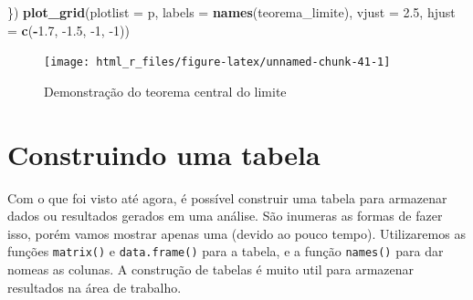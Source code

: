 \documentclass[
]{book}
\newenvironment{Shaded}{\begin{snugshade}}{\end{snugshade}}
\newcommand{\DataTypeTok}[1]{\textcolor[rgb]{0.13,0.29,0.53}{#1}}
\newcommand{\DecValTok}[1]{\textcolor[rgb]{0.00,0.00,0.81}{#1}}
\newcommand{\FloatTok}[1]{\textcolor[rgb]{0.00,0.00,0.81}{#1}}
\newcommand{\KeywordTok}[1]{\textcolor[rgb]{0.13,0.29,0.53}{\textbf{#1}}}
\newcommand{\NormalTok}[1]{#1}
\newcommand{\OperatorTok}[1]{\textcolor[rgb]{0.81,0.36,0.00}{\textbf{#1}}}
\begin{document}
\begin{Shaded}
\begin{Highlighting}[]
\NormalTok{\})}
\KeywordTok{plot_grid}\NormalTok{(}\DataTypeTok{plotlist =}\NormalTok{ p,}
          \DataTypeTok{labels =} \KeywordTok{names}\NormalTok{(teorema_limite),}
          \DataTypeTok{vjust =} \FloatTok{2.5}\NormalTok{,}
          \DataTypeTok{hjust =} \KeywordTok{c}\NormalTok{(}\OperatorTok{-}\FloatTok{1.7}\NormalTok{, }\FloatTok{-1.5}\NormalTok{, }\DecValTok{-1}\NormalTok{, }\DecValTok{-1}\NormalTok{))}
\end{Highlighting}
\end{Shaded}

\begin{figure}

{\centering \texttt{[image: html\_r\_files/figure-latex/unnamed-chunk-41-1]} 

}

\caption{Demonstração do teorema central do limite}\label{fig:unnamed-chunk-41}
\end{figure}

\hypertarget{dataframe}{%
\chapter{Construindo uma tabela}\label{dataframe}}

Com o que foi visto até agora, é possível construir uma tabela para armazenar dados ou resultados gerados em uma análise. São inumeras as formas de fazer isso, porém vamos mostrar apenas uma (devido ao pouco tempo). Utilizaremos as funções \texttt{matrix()}  e \texttt{data.frame()}  para a tabela, e a função \texttt{names()} para dar nomeas as colunas. A construção de tabelas é muito util para armazenar resultados na área de trabalho.
\end{document}
